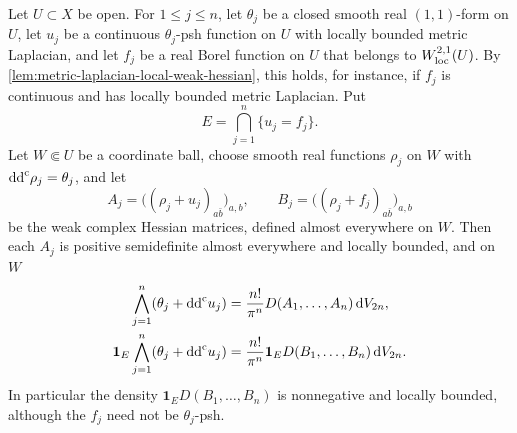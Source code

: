 \begin{proposition}\label{prop:metric-laplacian-regular-contact-density}
Let $U\subset X$ be open. For $1\leq j\leq n$, let $\theta_j$ be a closed smooth real $(1,1)$-form on $U$, let $u_j$ be a continuous $\theta_j$-psh function on $U$ with locally bounded metric Laplacian, and let $f_j$ be a real Borel function on $U$ that belongs to $W^{2,1}_{\mathrm{loc}}(U)$. By \cref{lem:metric-laplacian-local-weak-hessian}, this holds, for instance, if $f_j$ is continuous and has locally bounded metric Laplacian. Put
\[
 E=\bigcap_{j=1}^n\{u_j=f_j\}.
\]
Let $W\Subset U$ be a coordinate ball, choose smooth real functions $\rho_j$ on $W$ with $\mathrm{dd}^{\mathrm{c}}\rho_j=\theta_j$, and let
\[
 A_j=\bigl((\rho_j+u_j)_{a\bar b}\bigr)_{a,b},
 \qquad
 B_j=\bigl((\rho_j+f_j)_{a\bar b}\bigr)_{a,b}
\]
be the weak complex Hessian matrices, defined almost everywhere on $W$. Then each $A_j$ is positive semidefinite almost everywhere and locally bounded, and on $W$
\[
 \begin{aligned}
 \bigwedge_{j=1}^n(\theta_j+\mathrm{dd}^{\mathrm{c}} u_j)
       &=\frac{n!}{\pi^n}D(A_1,\ldots,A_n)\,\mathrm dV_{2n},\\
 \mathbf1_E\bigwedge_{j=1}^n(\theta_j+\mathrm{dd}^{\mathrm{c}} u_j)
       &=\frac{n!}{\pi^n}\mathbf1_E D(B_1,\ldots,B_n)\,\mathrm dV_{2n}.
 \end{aligned}
\]
In particular the density $\mathbf1_ED(B_1,\ldots,B_n)$ is nonnegative and locally bounded, although the $f_j$ need not be $\theta_j$-psh.
\end{proposition}
